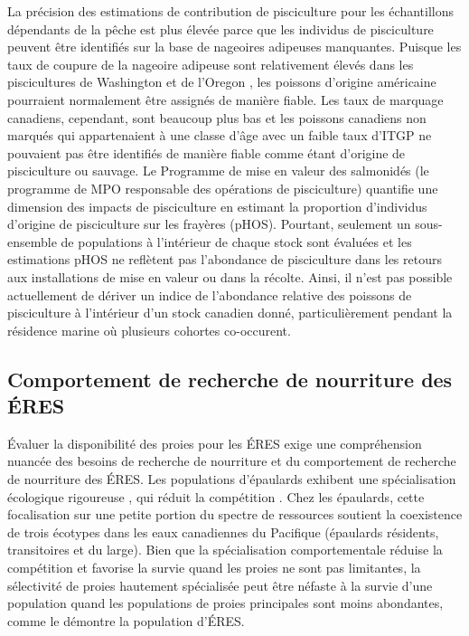 La précision des estimations de contribution de pisciculture pour les échantillons dépendants de la pêche est plus élevée parce que les individus de pisciculture peuvent être identifiés sur la base de nageoires adipeuses manquantes. Puisque les taux de coupure de la nageoire adipeuse sont relativement élevés dans les piscicultures de Washington et de l'Oregon \citep{andersonReviewHatcheryReform2020, wdfwAnadromousSalmonSteelhead2021, odfwFishPropagationAnnual2022}, les poissons d'origine américaine pourraient normalement être assignés de manière fiable. Les taux de marquage canadiens, cependant, sont beaucoup plus bas et les poissons canadiens non marqués qui appartenaient à une classe d'âge avec un faible taux d'ITGP ne pouvaient pas être identifiés de manière fiable comme étant d'origine de pisciculture ou sauvage. Le Programme de mise en valeur des salmonidés (le programme de MPO responsable des opérations de pisciculture) quantifie une dimension des impacts de pisciculture en estimant la proportion d'individus d'origine de pisciculture sur les frayères (pHOS). Pourtant, seulement un sous-ensemble de populations à l'intérieur de chaque stock sont évaluées et les estimations pHOS ne reflètent pas l'abondance de pisciculture dans les retours aux installations de mise en valeur ou dans la récolte. Ainsi, il n'est pas possible actuellement de dériver un indice de l'abondance relative des poissons de pisciculture à l'intérieur d'un stock canadien donné, particulièrement pendant la résidence marine où plusieurs cohortes co-occurent.

\subsection{Comportement de recherche de nourriture des ÉRES}

Évaluer la disponibilité des proies pour les ÉRES exige une compréhension nuancée des besoins de recherche de nourriture et du comportement de recherche de nourriture des ÉRES. Les populations d'épaulards exhibent une spécialisation écologique rigoureuse \citep{rieschCulturalTraditionsEvolution2012}, qui réduit la compétition \citep{whiteheadConsequencesCulturallydrivenEcological2018}. Chez les épaulards, cette focalisation sur une petite portion du spectre de ressources soutient la coexistence de trois écotypes dans les eaux canadiennes du Pacifique (épaulards résidents, transitoires et du large). Bien que la spécialisation comportementale réduise la compétition et favorise la survie quand les proies ne sont pas limitantes, la sélectivité de proies hautement spécialisée peut être néfaste à la survie d'une population quand les populations de proies principales sont moins abondantes, comme le démontre la population d'ÉRES.

